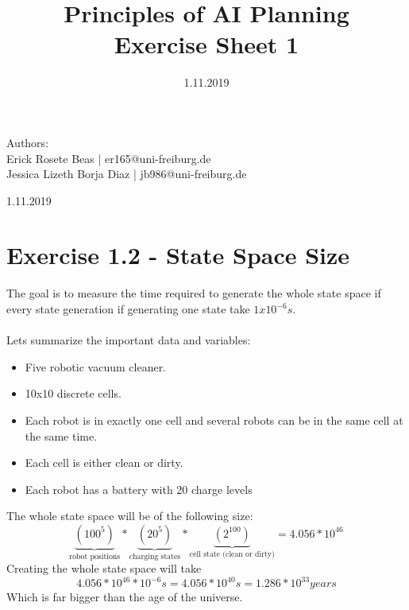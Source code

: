 \documentclass[12pt,a4paper]{article}
\title{\textbf{Principles of AI Planning
\\{\Large Exercise Sheet 1}}}
\date{1.11.2019}
\begin{document}
	\begin{flushleft}
		Authors:\\
		Erick Rosete Beas | er165@uni-freiburg.de\\
		Jessica Lizeth Borja Diaz | jb986@uni-freiburg.de\\
	\end{flushleft}
	{\let\newpage\relax\maketitle}
	\begin{center} 
		\large 1.11.2019 
	\end{center}
	
	\section*{Exercise 1.2 - State Space Size}
	The goal is to measure the time required to generate the whole state space if every state generation if generating one state
	take $1x10^{-6} s$.\\\\
	Lets summarize the important data and variables:
	\begin{itemize}[noitemsep]
		\item Five robotic vacuum cleaner.
		\item 10x10 discrete cells.
		\item Each robot is in exactly one cell and several robots can be in the same cell at the same time.
		\item Each cell is either clean or dirty.
		\item Each robot has a battery with 20 charge levels
	\end{itemize}
	The whole state space will be of the following size:
	\[
		\underbrace{(100^{5})}_{\text{robot positions}}*
		\underbrace{(20^{5})}_{\text{charging states}}*
		\underbrace{(2^{100})}_{\text{cell state (clean or dirty)}} = 4.056*10^{46}
	\]
	Creating the whole state space will take
	\[4.056*10^{46}*10^{-6}s = 4.056*10^{40} s = 1.286*10^{33} years\]
	Which is far bigger than the age of the universe.
	
	
\end{document}
